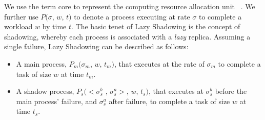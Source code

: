 



We use the term core to represent the computing resource allocation unit%
~\cite{casanova_inria_2012}. 
We further use $P(\sigma$, $w$, $t)$ to denote a process executing at rate $\sigma$ to complete a workload $w$ by time $t$.
The basic tenet of Lazy Shadowing is the concept of shadowing, whereby each process is associated with a {\it lazy} replica. %
Assuming a single failure, Lazy Shadowing can be described as follows:
\begin{itemize}
	\item A main process, $P_m(\sigma_m$, $w$, $t_m)$, that executes at the rate of $\sigma_m$ to complete a task of size $w$ at time $t_m$.
	\item A shadow process, $P_s(<\sigma_s^b$ , $\sigma_s^a>$, $w$, $t_s)$, that executes at $\sigma_s^b$ before the main process' failure, and $\sigma_s^a$ after failure, to complete a task of size $w$ at time $t_s$.%
\end{itemize}

